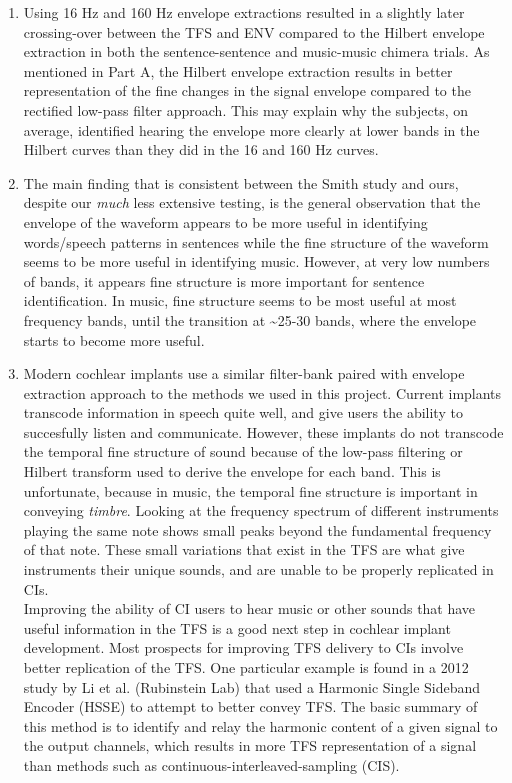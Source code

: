 \documentclass[9pt]{extarticle}
\begin{document}
\begin{enumerate}[label = \alph*)]
\begin{center}
\end{center}

\item Using 16 Hz and 160 Hz envelope extractions resulted in a slightly later crossing-over between the TFS and ENV compared to the Hilbert envelope extraction in both the sentence-sentence and music-music chimera trials. As mentioned in Part A, the Hilbert envelope extraction results in better representation of the fine changes in the signal envelope compared to the rectified low-pass filter approach. This may explain why the subjects, on average, identified hearing the envelope more clearly at lower bands in the Hilbert curves than they did in the 16 and 160 Hz curves.  

\item The main finding that is consistent between the Smith study and ours, despite our \textit{much} less extensive testing, is the general observation that the envelope of the waveform appears to be more useful in identifying words/speech patterns in sentences while the fine structure of the waveform seems to be more useful in identifying music. However, at very low numbers of bands, it appears fine structure is more important for sentence identification. In music, fine structure seems to be most useful at most frequency bands, until the transition at \textasciitilde 25-30 bands, where the envelope starts to become more useful.

\item Modern cochlear implants use a similar filter-bank paired with envelope extraction approach to the methods we used in this project. Current implants transcode information in speech quite well, and give users the ability to succesfully listen and communicate. However, these implants do not transcode the temporal fine structure of sound because of the low-pass filtering or Hilbert transform used to derive the envelope for each band. This is unfortunate, because in music, the temporal fine structure is important in conveying \textit{timbre}. Looking at the frequency spectrum of different instruments playing the same note shows small peaks beyond the fundamental frequency of that note. These small variations that exist in the TFS are what give instruments their unique sounds, and are unable to be properly replicated in CIs. \\

Improving the ability of CI users to hear music or other sounds that have useful information in the TFS is a good next step in cochlear implant development. Most prospects for improving TFS delivery to CIs involve better replication of the TFS. One particular example is found in a 2012 study by Li et al. (Rubinstein Lab) that used a Harmonic Single Sideband Encoder (HSSE) to attempt to better convey TFS. The basic summary of this method is to identify and relay the harmonic content of a given signal to the output channels, which results in more TFS representation of a signal than methods such as continuous-interleaved-sampling (CIS). 
\end{enumerate}
\end{document}
